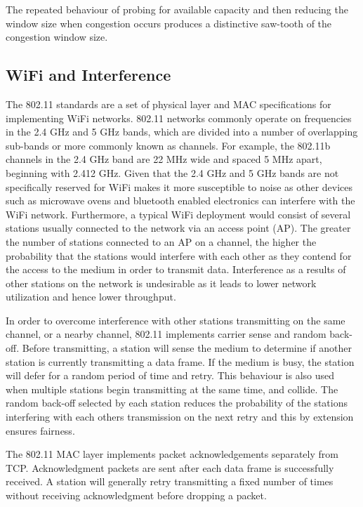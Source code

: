 The repeated behaviour of probing for available capacity and then reducing the
window size when congestion occurs produces a distinctive saw-tooth of the
congestion window size.

\subsection{WiFi and Interference}
The 802.11 standards are a set of physical layer and MAC specifications for
implementing WiFi networks.  802.11 networks commonly operate on frequencies in
the 2.4 GHz and 5 GHz bands, which are divided into a number of overlapping
sub-bands or more commonly known as channels. For example, the 802.11b channels
in the 2.4 GHz band are 22 MHz wide and spaced 5 MHz apart, beginning with 2.412
GHz. Given that the 2.4 GHz and 5 GHz bands are not specifically reserved for
WiFi makes it more susceptible to noise as other devices such as microwave ovens
and bluetooth enabled electronics can interfere with the WiFi network.
Furthermore, a typical WiFi deployment would consist of several stations usually
connected to the network via an access point (AP). The greater the number of
stations connected to an AP on a channel, the higher the probability that the
stations would interfere with each other as they contend for the access to the
medium in order to transmit data. Interference as a results of other stations on
the network is undesirable as it leads to lower network utilization and hence
lower throughput.

In order to overcome interference with other stations transmitting on the same
channel, or a nearby channel, 802.11 implements carrier sense and random
back-off. Before transmitting, a station will sense the medium to determine if
another station is currently transmitting a data frame. If the medium is busy,
the station will defer for a random period of time and retry. This behaviour is
also used when multiple stations begin transmitting at the same time, and
collide. The random back-off selected by each station reduces the probability of
the stations interfering with each others transmission on the next retry and
this by extension ensures fairness.

The 802.11 MAC layer implements packet acknowledgements separately from TCP.\@
Acknowledgment packets are sent after each data frame is successfully received.
A station will generally retry transmitting a fixed number of times without
receiving acknowledgment before dropping a packet.

